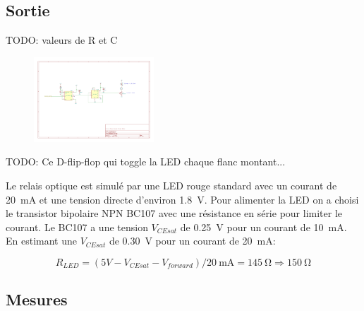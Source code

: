 \documentclass[french]{layout/Report}
\begin{document}
\subsection{Sortie}

\begin{description}[leftmargin=!,labelwidth=4cm, labelindent=\parindent]
	\item[Détecteur d'interruption] TODO: valeurs de R et C

    \begin{figure}[H]
    \centering
    \includegraphics[width=0.4\textwidth]{fig/interrupt_detect.pdf}
    \end{figure}

    \item[Commutateur] TODO: Ce D-flip-flop qui toggle la LED chaque flanc montant...


	\item[Relais] Le relais optique est simulé par une LED rouge standard avec un courant de \SI{20}{\milli\ampere} et une tension directe d'environ \SI{1.8}{\volt}. Pour alimenter la LED on a choisi le transistor bipolaire NPN BC107 avec une résistance en série pour limiter le courant.
		Le BC107 a une tension \(V_{CEsat}\) de \SI{0.25}{\volt} pour un courant de \SI{10}{\milli\ampere}.
		En estimant une \(V_{CEsat}\) de \SI{0.30}{\volt} pour un courant de \SI{20}{\milli\ampere}:

    \begin{equation*}
    R_{LED} = (5V - V_{CEsat} - V_{forward})/\SI{20}{\milli\ampere} = \SI{145}{\ohm} \Rightarrow \SI{150}{\ohm}
    \end{equation*}


\end{description}
\subsection{Mesures}
\end{document}
